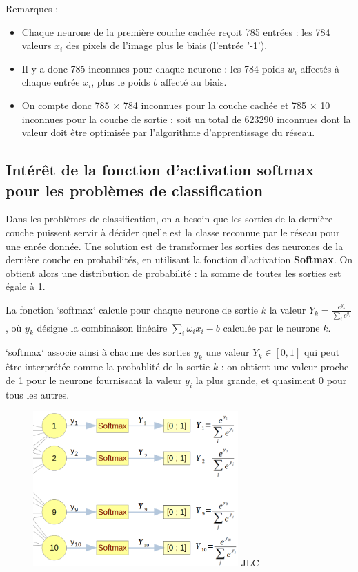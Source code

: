 \documentclass{article}
\begin{document}
Remarques : 

\begin{itemize}
\item Chaque neurone de la première couche cachée reçoit 785 entrées : les 784 valeurs $x_i$ des pixels de l'image plus le biais (l'entrée '-1'). 
\item Il y a donc 785 inconnues pour chaque neurone : les 784 poids $w_i$ affectés à chaque entrée $x_i$, plus le  poids $b$ affecté au biais.
\item On compte donc 785 $\times$ 784 inconnues pour la couche cachée et 785 $\times$ 10 inconnues pour la couche de sortie : 
soit un total de 623290 inconnues dont la valeur doit être optimisée par l'algorithme d'apprentissage du réseau.
\end{itemize}



\subsection{Intérêt de la fonction d'activation softmax pour les problèmes de classification}

Dans les problèmes de classification, on a besoin que les sorties de la dernière couche 
puissent servir à décider quelle est la classe reconnue par le réseau pour une enrée donnée.
Une solution est de transformer les sorties des neurones de la dernière couche en probabilités, 
en utilisant la fonction d'activation \textbf{Softmax}. On obtient alors une distribution de probabilité : 
la somme de toutes les sorties est égale à 1.


\bigskip



La fonction `softmax` calcule pour chaque neurone de sortie $k$ la valeur $\displaystyle{Y_k = \frac{e^{y_k}}{\sum_i{e^{y_i}}}}$,
où $y_k$ désigne la combinaison linéaire $\sum_i \omega_i x_i - b$ calculée par le neurone $k$.


\bigskip


`softmax` associe ainsi à chacune des sorties $y_k$ une valeur $Y_k \in [0, 1]$ 
qui peut être interprétée comme la probablité de la sortie $k$ : 
on obtient une valeur proche de 1 pour le neurone fournissant 
la valeur $y_i$ la plus grande, et quasiment 0 pour tous les autres.

\begin{figure}[H]
\centering
\includegraphics[width=0.7\textwidth]{img/softmax.png}
JLC
\end{figure}
\end{document}
